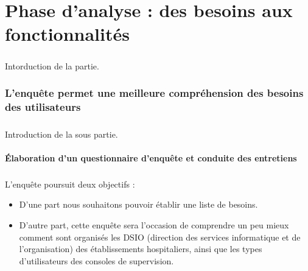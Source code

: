 \chapter{Phase d'analyse : des besoins aux fonctionnalités}
	\paragraph{}
	Intorduction de la partie.
	
	\subsection{L'enquête permet une meilleure compréhension des besoins des utilisateurs}
		\paragraph{}
		Introduction de la sous partie.
		
		\subsubsection{Élaboration d'un questionnaire d'enquête et conduite des entretiens}
			\paragraph{}%
			L'enquête poursuit deux objectifs :
			\begin{itemize}
			  \item D’une part nous souhaitons pouvoir établir une liste de besoins.
			  \item D’autre part, cette enquête sera l’occasion de comprendre un peu
			  mieux comment sont organisés les DSIO (direction des services informatique
			  et de l’organisation) des établissements hospitaliers, ainsi que les types
			  d’utilisateurs des consoles de supervision.
			\end{itemize}
			
